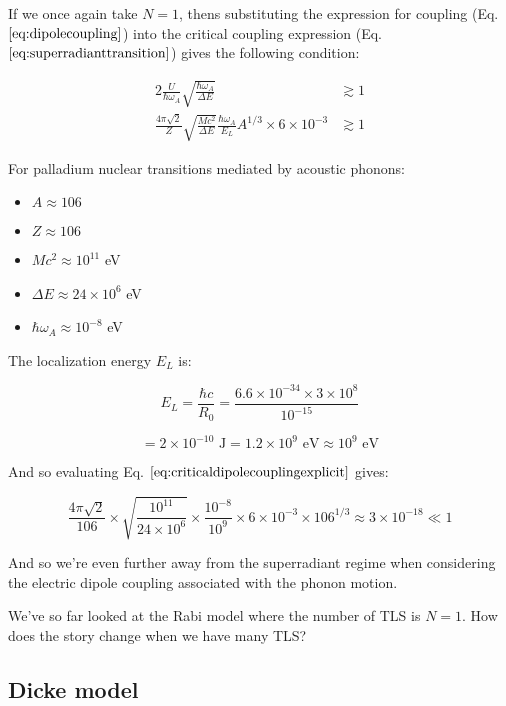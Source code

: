 \documentclass[
]{article}
\renewcommand{\[}{\begin{equation}}
\renewcommand{\]}{\end{equation}}
\providecommand{\tightlist}{%
  \setlength{\itemsep}{0pt}\setlength{\parskip}{0pt}}
\begin{document}
If we once again take \(N=1\), thens substituting the expression for
coupling (Eq. \(\ref{eq:dipolecoupling}\)) into the critical coupling
expression (Eq. \(\ref{eq:superradianttransition}\)) gives the following
condition:

\[
\begin{aligned}
2\frac{U}{\hbar\omega_A}\sqrt{\frac{\hbar\omega_A}{\Delta E}} &\gtrsim 1 \\
\frac{4\pi\sqrt{2}}{Z} \sqrt{\frac{M c^2}{\Delta E}} \frac{\hbar \omega_A}{E_L} A^{1/3} \times 6 \times 10^{-3} &\gtrsim 1
\end{aligned}
\label{eq:criticaldipolecouplingexplicit}
\]

For palladium nuclear transitions mediated by acoustic phonons:

\begin{itemize}
\tightlist
\item
  \(A \approx 106\)
\item
  \(Z \approx 106\)
\item
  \(M c^2 \approx 10^{11}\) eV
\item
  \(\Delta E \approx 24 \times 10^{6}\) eV\\
\item
  \(\hbar \omega_A \approx 10^{-8}\) eV
\end{itemize}

The localization energy \(E_L\) is:

\[
E_L = \frac{\hbar c}{R_0} = \frac{6.6 \times 10^{-34} \times 3 \times 10^8}{10^{-15}}
\]

\[
= 2 \times 10^{-10} \text{ J} = 1.2 \times 10^9 \text{ eV} \approx 10^9 \text{ eV}
\]

And so evaluating Eq. \(\ref{eq:criticaldipolecouplingexplicit}\) gives:

\[
\frac{4 \pi\sqrt{2} }{106} \times \sqrt{\frac{10^{11}}{24\times10^{6}}} \times \frac{10^{-8}}{10^9} \times 6 \times 10^{-3} \times 106^{1/3} \approx 3\times 10^{-18} \ll 1
\]

And so we're even further away from the superradiant regime when
considering the electric dipole coupling associated with the phonon
motion.

We've so far looked at the Rabi model where the number of TLS is
\(N=1\). How does the story change when we have many TLS?

\subsection{Dicke model}\label{dicke-model}
\end{document}
